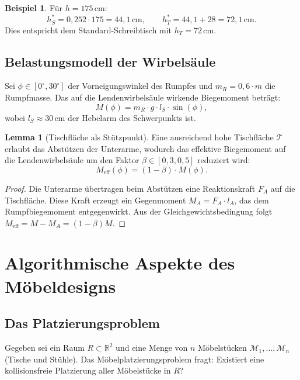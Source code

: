 \documentclass[a4paper,12pt]{article}
\theoremstyle{definition}
\newtheorem{beispiel}{Beispiel}
\newtheorem{lemma}{Lemma}
\begin{document}
\begin{beispiel}
	F\"{u}r $h = 175\,\mathrm{cm}$:
	\[
		h_S^* = 0{,}252 \cdot 175 = 44{,}1\,\mathrm{cm}, \qquad
		h_T^* = 44{,}1 + 28 = 72{,}1\,\mathrm{cm}.
	\]
	Dies entspricht dem Standard-Schreibtisch mit $h_T = 72\,\mathrm{cm}$.
\end{beispiel}

\subsection{Belastungsmodell der Wirbels\"{a}ule}

Sei $\phi \in [0^{\circ}, 30^{\circ}]$ der Vorneigungswinkel des Rumpfes und
$m_R = 0{,}6 \cdot m$ die Rumpfmasse. Das auf die Lendenwirbels\"{a}ule wirkende
Biegemoment betr\"{a}gt:
\[
	M(\phi) = m_R \cdot g \cdot l_S \cdot \sin(\phi),
\]
wobei $l_S \approx 30\,\mathrm{cm}$ der Hebelarm des Schwerpunkts ist.

\begin{lemma}[Tischfl\"{a}che als St\"{u}tzpunkt]
	Eine ausreichend hohe Tischfl\"{a}che $\mathcal{T}$ erlaubt das Abst\"{u}tzen der Unterarme,
	wodurch das effektive Biegemoment auf die Lendenwirbels\"{a}ule um den Faktor
	$\beta \in [0{,}3, 0{,}5]$ reduziert wird:
	\[
		M_{\mathrm{eff}}(\phi) = (1 - \beta) \cdot M(\phi).
	\]
\end{lemma}

\begin{proof}
	Die Unterarme \"{u}bertragen beim Abst\"{u}tzen eine Reaktionskraft $F_A$ auf die Tischfl\"{a}che.
	Diese Kraft erzeugt ein Gegenmoment $M_A = F_A \cdot l_A$, das dem Rumpfbiegemoment
	entgegenwirkt. Aus der Gleichgewichtsbedingung folgt
	$M_{\mathrm{eff}} = M - M_A = (1 - \beta) M$.
\end{proof}

\section{Algorithmische Aspekte des M\"{o}beldesigns}

\subsection{Das Platzierungsproblem}

Gegeben sei ein Raum $R \subset \mathbb{R}^2$ und eine Menge von $n$ M\"{o}belst\"{u}cken
$\mathcal{M}_1, \ldots, \mathcal{M}_n$ (Tische und St\"{u}hle). Das M\"{o}belplatzierungsproblem
fragt: Existiert eine kollisionsfreie Platzierung aller M\"{o}belst\"{u}cke in $R$?
\end{document}
